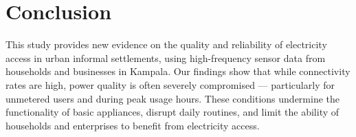 \documentclass[review]{elsarticle}
\begin{document}



\section{Conclusion}

This study provides new evidence on the quality and reliability of electricity access in urban informal settlements, using high-frequency sensor data from households and businesses in Kampala. Our findings show that while connectivity rates are high, power quality is often severely compromised — particularly for unmetered users and during peak usage hours. These conditions undermine the functionality of basic appliances, disrupt daily routines, and limit the ability of households and enterprises to benefit from electricity access.
\end{document}

